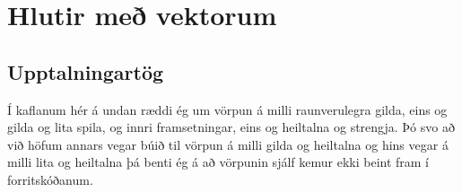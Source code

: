 





\chapter{Hlutir með vektorum}

\section{Upptalningartög}

Í kaflanum hér á undan ræddi ég um vörpun á milli raunverulegra gilda, eins og gilda og lita spila, 
og innri framsetningar, eins og heiltalna og strengja.
Þó svo að við höfum annars vegar búið til vörpun á milli gilda og heiltalna og hins vegar á milli lita og heiltalna
þá benti ég á að vörpunin sjálf kemur ekki beint fram í forritskóðanum.


